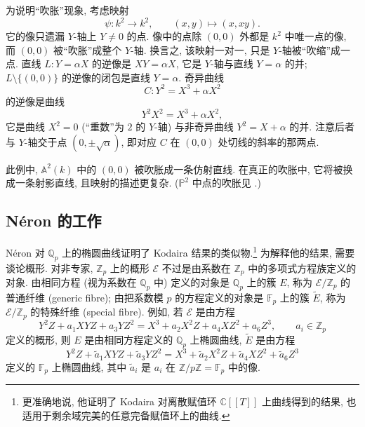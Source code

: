 \begin{example} \label{thm:2.7.2} 
为说明``吹胀''现象, 考虑映射
\[
\psi\colon k^2\to k^2, \qquad (x,y)\mapsto(x, xy).
\]
它的像只遗漏 $Y$-轴上 $Y\neq 0$ 的点. 像中的点除 $(0,0)$ 外都是 $k^2$ 中唯一点的像, 而 $(0,0)$ 被``吹胀''成整个 $Y$-轴. 换言之, 该映射一对一, 只是 $Y$-轴被``吹缩''成一点. 直线 $L\colon Y = \alpha X$ 的逆像是 $XY = \alpha X$, 它是 $Y$-轴与直线 $Y = \alpha$ 的并; $L\setminus\{(0,0)\}$ 的逆像的闭包是直线 $Y = \alpha$. 奇异曲线
\[
C\colon Y^2 = X^3 + \alpha X^2
\]
的逆像是曲线
\[
Y^2X^2 = X^3 + \alpha X^2,
\]
它是曲线 $X^2 = 0$ (``重数''为 $2$ 的 $Y$-轴) 与非奇异曲线 $Y^2 = X + \alpha$ 的并. 注意后者与 $Y$-轴交于点 $(0,\pm\sqrt{\alpha})$, 即对应 $C$ 在 $(0,0)$ 处切线的斜率的那两点.

此例中, $\mathbb{A}^2(k)$ 中的 $(0,0)$ 被吹胀成一条仿射直线. 在真正的吹胀中, 它将被换成一条射影直线, 且映射的描述更复杂. ($\mathbb{P}^2$ 中点的吹胀见 \cite[Chap. 7]{fulton1969}.)
\end{example}

\subsection*{N\'eron 的工作}

N\'eron 对 $\mathbb{Q}_p$ 上的椭圆曲线证明了 Kodaira 结果的类似物.\footnote{更准确地说, 他证明了 Kodaira 对离散赋值环 $\mathbb{C}[[T]]$ 上曲线得到的结果, 也适用于剩余域完美的任意完备赋值环上的曲线.} 为解释他的结果, 需要谈论概形. 对非专家, $\mathbb{Z}_p$ 上的概形 $\mathcal{E}$ 不过是由系数在 $\mathbb{Z}_p$ 中的多项式方程族定义的对象. 由相同方程 (视为系数在 $\mathbb{Q}_p$ 中) 定义的对象是 $\mathbb{Q}_p$ 上的簇 $E$, 称为 $\mathcal{E}/\mathbb{Z}_p$ 的普通纤维 (generic fibre); 由把系数模 $p$ 的方程定义的对象是 $\mathbb{F}_p$ 上的簇 $\tilde{E}$, 称为 $\mathcal{E}/\mathbb{Z}_p$ 的特殊纤维 (special fibre). 例如, 若 $\mathcal{E}$ 是由方程
\[
Y^2Z + a_1XYZ + a_3YZ^2 = X^3 + a_2X^2Z + a_4XZ^2 + a_6Z^3, \qquad a_i\in\mathbb{Z}_p
\]
定义的概形, 则 $E$ 是由相同方程定义的 $\mathbb{Q}_p$ 上椭圆曲线, $\tilde{E}$ 是由方程
\[
Y^2Z + \tilde{a}_1XYZ + \tilde{a}_3YZ^2 = X^3 + \tilde{a}_2X^2Z + \tilde{a}_4XZ^2 + \tilde{a}_6Z^3
\]
定义的 $\mathbb{F}_p$ 上椭圆曲线, 其中 $\tilde{a}_i$ 是 $a_i$ 在 $\mathbb{Z}/p\mathbb{Z} = \mathbb{F}_p$ 中的像.

